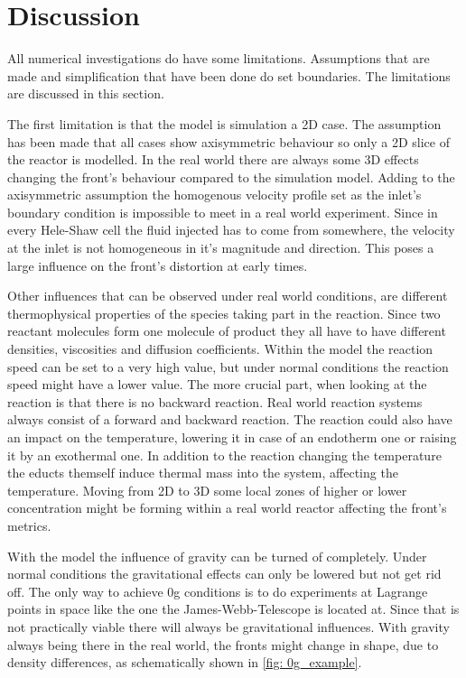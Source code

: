 \documentclass[../thesis.tex]{subfiles}
\begin{document}
\chapter{Discussion}
\label{chp: dicus}
All numerical investigations do have some limitations. Assumptions that are made and simplification that have been done do set boundaries. The limitations are discussed in this section.

The first limitation is that the model is simulation a 2D case. The assumption has been made that all cases show axisymmetric behaviour so only a 2D slice of the reactor is modelled. In the real world there are always some 3D effects changing the front's behaviour compared to the simulation model. Adding to the axisymmetric assumption the homogenous velocity profile set as the inlet's boundary condition is impossible to meet in a real world experiment. Since in every Hele-Shaw cell the fluid injected has to come from somewhere, the velocity at the inlet is not homogeneous in it's magnitude and direction. This poses a large influence on the front's distortion at early times. 

Other influences that can be observed under real world conditions, are different thermophysical properties of the species taking part in the reaction. Since two reactant molecules form one molecule of product they all have to have different densities, viscosities and diffusion coefficients. Within the model the reaction speed can be set to a very high value, but under normal conditions the reaction speed might have a lower value. The more crucial part, when looking at the reaction is that there is no backward reaction. Real world reaction systems always consist of a forward and backward reaction. The reaction could also have an impact on the temperature, lowering it in case of an endotherm one or raising it by an exothermal one. In addition to the reaction changing the temperature the educts themself induce thermal mass into the system, affecting the temperature. Moving from 2D to 3D some local zones of higher or lower concentration might be forming within a real world reactor affecting the front's metrics.

With the model the influence of gravity can be turned of completely. Under normal conditions the gravitational effects can only be lowered but not get rid off. The only way to achieve 0g conditions is to do experiments at Lagrange points in space like the one the James-Webb-Telescope is located at. Since that is not practically viable there will always be gravitational influences. With gravity always being there in the real world, the fronts might change in shape, due to density differences, as schematically shown in \autoref{fig: 0g_example}.
\end{document}
